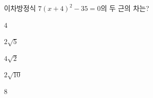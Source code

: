 이차방정식 $7(x+4)^2-35=0$의 두 근의 차는?
\begin{choices32}{\rule[-3ex]{0pt}{8ex}$4$}{\rule[-3ex]{0pt}{8ex}$2\sqrt{5}$}{\rule[-3ex]{0pt}{8ex}$4\sqrt{2}$}{\rule[-3ex]{0pt}{8ex}$2\sqrt{10}$}{\rule[-3ex]{0pt}{8ex}$8$}\end{choices32}
